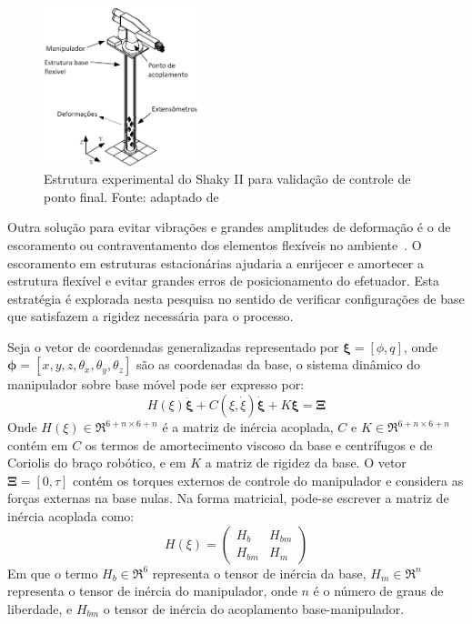 \begin{figure}[h]
	\centering 
 	\includegraphics[width=0.40\textwidth]{figs/shaky}
 	\caption[Estrutura experimental do Shaky II]{Estrutura experimental do Shaky II para validação de
 	controle de ponto final. Fonte: adaptado de \cite{mavroidis1997optimal}}
 	\label{fig::shaky}
\end{figure}

Outra solução para evitar vibrações e grandes amplitudes de deformação é o
de escoramento ou contraventamento dos elementos flexíveis no
ambiente~\cite{lew1994bracing}. O escoramento em estruturas estacionárias
ajudaria a enrijecer e amortecer a estrutura flexível e evitar grandes erros de
posicionamento do efetuador. Esta estratégia é explorada nesta pesquisa no
sentido de verificar configurações de base que satisfazem a rigidez necessária para o
processo.

Seja o vetor de coordenadas generalizadas representado por $\boldsymbol{\xi} =
[\phi, q]$, onde $\boldsymbol{\phi} = [x, y, z, \theta_x, \theta_y, \theta_z]$
são as coordenadas da base, o sistema dinâmico do manipulador sobre base móvel
pode ser expresso por:
%
\begin{equation}
	H(\xi) \ddot{\boldsymbol{\xi}} + C(\xi , \dot{\xi}) \dot{\boldsymbol{\xi}} + K
	\boldsymbol{\xi} = \boldsymbol{\Xi}
\end{equation}
%
Onde $H(\xi) \in \Re^{6+n \times 6+n}$ é a matriz de inércia acoplada, $C$ e $K
\in \Re^{6+n \times 6+n}$ contém em $C$ os termos de amortecimento viscoso da
base e centrífugos e de Coriolis do braço robótico, e em $K$ a matriz de rigidez
da base.
O vetor $\boldsymbol{\Xi} = [0, \tau]$ contém os torques externos de controle do
manipulador e considera as forças externas na base nulas. Na forma matricial,
pode-se escrever a matriz de inércia acoplada como:
%
\begin{equation}
	H(\xi) = \begin{pmatrix}
			H_b 	&	H_{bm} \\ 
			H_{bm}	&	H_m
\end{pmatrix}
\end{equation}
%
Em que o termo $H_b \in \Re^{6}$ representa o tensor de inércia da base, $H_m
\in \Re^{n}$ representa o tensor de inércia do manipulador, onde $n$ é o número
de graus de liberdade, e $H_{bm}$ o tensor de inércia do acoplamento
base-manipulador.

